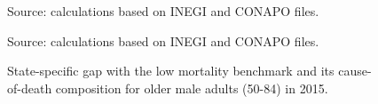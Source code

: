 \documentclass{bmcart}
\begin{document}
\begin{backmatter}
\begin{figure}[h!]
Source: calculations based on INEGI and CONAPO files. 
\end{figure}


\begin{figure}[h!]
\centering
\caption{State-specific gap with the low mortality benchmark and its cause-of-death composition for older male adults (50-84) in 2015.}

\label{Fig5}

Source: calculations based on INEGI and CONAPO files. 
\end{figure}




\end{backmatter}
\end{document}
